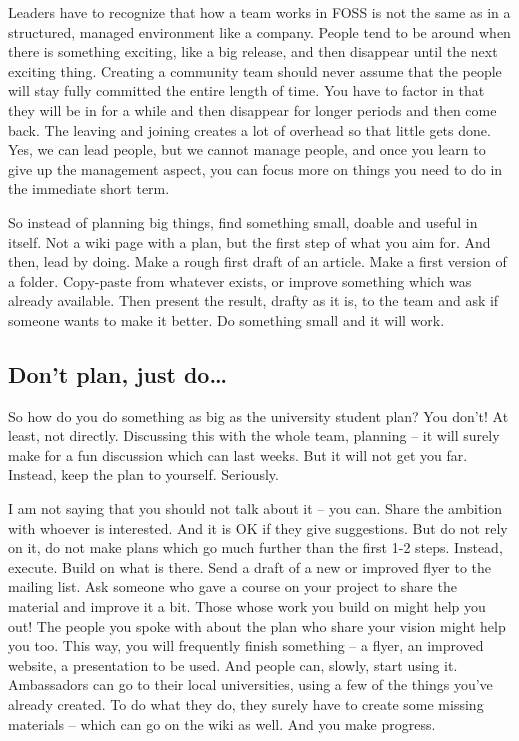 Leaders have to recognize that how a team works in FOSS is not the same as in a structured, managed environment like a company. People tend to be around when there is something exciting, like a big release, and then disappear until the next exciting thing. Creating a community team should never assume that the people will stay fully committed the entire length of time. You have to factor in that they will be in for a while and then disappear for longer periods and then come back. The leaving and joining creates a lot of overhead so that little gets done. Yes, we can lead people, but we cannot manage people, and once you learn to give up the management aspect, you can focus more on things you need to do in the immediate short term.

So instead of planning big things, find something small, doable and useful in itself. Not a wiki page with a plan, but the first step of what you aim for. And then, lead by doing. Make a rough first draft of an article. Make a first version of a folder. Copy-paste from whatever exists, or improve something which was already available. Then present the result, drafty as it is, to the team and ask if someone wants to make it better. Do something small and it will work.

\subsection*{Don't plan, just do\dots}
So how do you do something as big as the university student plan? You don't! At least, not directly. Discussing this with the whole team, planning -- it will surely make for a fun discussion which can last weeks. But it will not get you far. Instead, keep the plan to yourself. Seriously.

I am not saying that you should not talk about it -- you can. Share the ambition with whoever is interested. And it is OK if they give suggestions. But do not rely on it, do not make plans which go much further than the first 1-2 steps. Instead, execute. Build on what is there. Send a draft of a new or improved flyer to the mailing list. Ask someone who gave a course on your project to share the material and improve it a bit. Those whose work you build on might help you out! The people you spoke with about the plan who share your vision might help you too. This way, you will frequently finish something -- a flyer, an improved website, a presentation to be used. And people can, slowly, start using it. Ambassadors can go to their local universities, using a few of the things you've already created. To do what they do, they surely have to create some missing materials -- which can go on the wiki as well. And you make progress.

